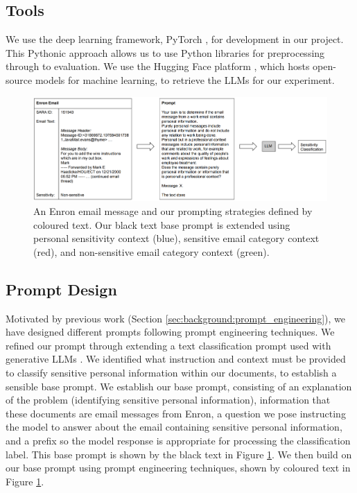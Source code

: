 \subsection{Tools}
We use the deep learning framework, PyTorch \cite{paszke2019pytorch}, for development in our project. This Pythonic approach allows us to use Python libraries for preprocessing through to evaluation. We use the Hugging Face platform \cite{wolf-etal-2020-transformers}, which hosts open-source models for machine learning, to retrieve the LLMs for our experiment.

\begin{figure}
\begin{center}
\includegraphics[scale=0.27]{figures/inputprompt.pdf}
\end{center}
\caption{\label{fig-input}An Enron email message and our prompting strategies defined by coloured text. Our black text base prompt is extended using personal sensitivity context (blue), sensitive email category context (red), and non-sensitive email category context (green).}
\end{figure}

\subsection{Prompt Design}
Motivated by previous work (Section \ref{sec:background:prompt_engineering}), we have designed different prompts following prompt engineering techniques. We refined our prompt through extending a text classification prompt used with generative LLMs \cite{kocon2023chatgpt, puri2019zero}. We identified what instruction and context must be provided to classify sensitive personal information within our documents, to establish a sensible base prompt. We establish our base prompt, consisting of an explanation of the problem (identifying sensitive personal information), information that these documents are email messages from Enron, a question we pose instructing the model to answer about the email containing sensitive personal information, and a prefix so the model response is appropriate for processing the classification label. This base prompt is shown by the black text in Figure \ref{fig-input}. We then build on our base prompt using prompt engineering techniques, shown by coloured text in Figure \ref{fig-input}.

